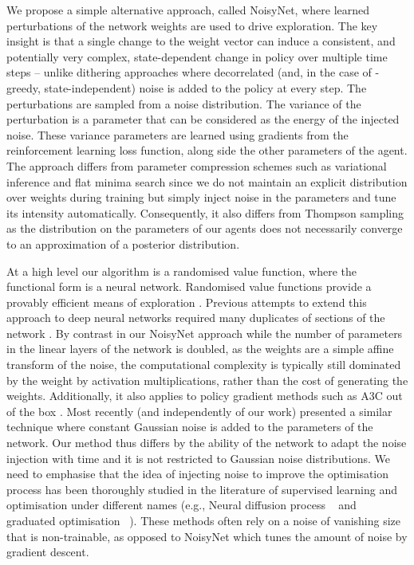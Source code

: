\documentclass{article}
\newcommand{\algoinit}{NoisyNet}
\begin{document}
We propose a simple alternative approach, called \algoinit{}, where learned perturbations of the network weights are used to drive exploration.
The key insight is that a single change to the weight vector can induce a consistent, and potentially very complex, state-dependent change in policy over multiple time steps -- unlike dithering approaches where decorrelated (and, in the case of  -greedy, state-independent) noise is added to the policy at every step.
The perturbations are sampled from a noise distribution.
The variance of the perturbation is a parameter that can be considered as the energy of the injected noise.
These variance parameters are learned using gradients from the reinforcement learning loss function, along side the other parameters of the agent.
The approach differs from parameter compression schemes such as variational inference \citep{hinton1993keeping,bishop1995training,graves2011practical,blundell2015weight,gal16} and flat minima search \citep{hochreiter1997flat} since we do not maintain an explicit distribution over weights during training but simply inject noise in the parameters and tune its intensity automatically. Consequently, it also differs from Thompson sampling \citep{thompson1933likelihood,lipton2016efficient} as the distribution on the parameters of our agents does not necessarily converge to an approximation of a posterior distribution.


At a high level our algorithm is a randomised value function, where the functional form is a neural network. Randomised value functions provide a provably efficient means of exploration \citep{osband2014generalization}. Previous attempts to extend this approach to deep neural networks required many duplicates of sections of the network \citep{osband2016deep}.
By contrast in our \algoinit{} approach while the number of parameters in the linear layers of the network is doubled, as the weights are a simple affine transform of the noise, the computational complexity is typically still dominated by the weight by activation multiplications, rather than the cost of generating the weights. Additionally, it also applies to policy gradient methods such as A3C out of the box \citep{mnih2016asynchronous}.
Most recently (and independently of our work) \citet{plappert2017parameter} presented a similar technique where constant Gaussian noise is added to the parameters of the network. Our method thus differs by the ability of the network to adapt the noise injection with time and it is not restricted to Gaussian noise distributions. We need to emphasise that the idea of injecting noise to improve the optimisation process has been thoroughly studied in the literature of supervised learning and optimisation under different names (e.g., Neural diffusion process ~\citep{mobahi2016training} and graduated optimisation  ~\citep{hazan2016graduated}). These methods often rely on a noise of vanishing size that is non-trainable, as opposed to NoisyNet which tunes the amount of noise by gradient descent. 
\end{document}
